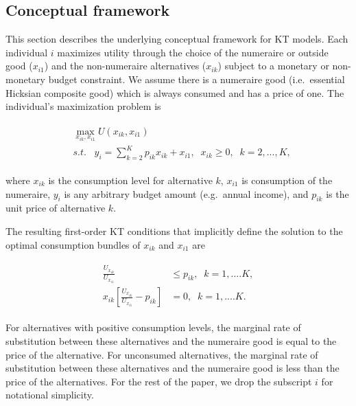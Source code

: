 \hypertarget{conceptual-framework}{%
\subsection{Conceptual framework}\label{conceptual-framework}}

This section describes the underlying conceptual framework for KT
models. Each individual \(i\) maximizes utility through the choice of
the numeraire or outside good (\(x_{i1}\)) and the non-numeraire
alternatives (\(x_{ik}\)) subject to a monetary or non-monetary budget
constraint. We assume there is a numeraire good (i.e.~essential Hicksian
composite good) which is always consumed and has a price of one. The
individual's maximization problem is

\begin{align}
\begin{split}
 & \max_{x_{ik}, x_{i1}} U(x_{ik}, x_{i1}) \\
& s.t. \;\;\;y_i = \sum\limits^K_{k=2}p_{ik} x_{ik} + x_{i1}, \;\; x_{ik} \geq 0,\;\; k = 2,...,K,
  \end{split}
\end{align}

\noindent where \(x_{ik}\) is the consumption level for alternative
\(k\), \(x_{i1}\) is consumption of the numeraire, \(y_i\) is any
arbitrary budget amount (e.g.~annual income), and \(p_{ik}\) is the unit
price of alternative \(k\).

The resulting first-order KT conditions that implicitly define the
solution to the optimal consumption bundles of \(x_{ik}\) and \(x_{i1}\)
are

\begin{align}
\label{eq:kt_conditions}
\begin{split}
 \frac{U_{x_{ik}}}{U_{x_{i1}}} & \leq p_{ik},\; \; k = 1,....K , \\
  x_{ik}\left[\frac{U_{x_{ik}}}{U_{x_{i1}}} - p_{ik} \right] & = 0,\; \; k = 1,....K.
  \end{split}
\end{align}

For alternatives with positive consumption levels, the marginal rate of
substitution between these alternatives and the numeraire good is equal
to the price of the alternative. For unconsumed alternatives, the
marginal rate of substitution between these alternatives and the
numeraire good is less than the price of the alternatives. For the rest
of the paper, we drop the subscript \(i\) for notational simplicity.

